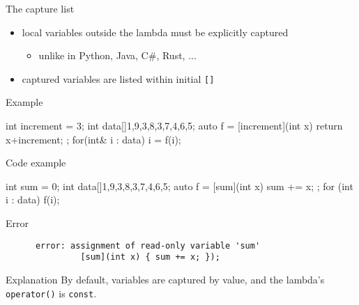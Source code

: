 \begin{frame}[fragile]
  \begin{block}{The capture list}
    \begin{itemize}
    \item local variables outside the lambda must be explicitly captured
    \begin{itemize}
      \item unlike in Python, Java, C\#, Rust, ...
    \end{itemize}
    \item captured variables are listed within initial \texttt{[]}
    \end{itemize}
  \end{block}
  \pause
  \begin{exampleblock}{Example}
    \begin{cppcode*}{}
      int increment = 3;
      int data[]{1,9,3,8,3,7,4,6,5};
      auto f = [increment](int x) { return x+increment; };
      for(int& i : data) i = f(i);
    \end{cppcode*}
  \end{exampleblock}
\end{frame}

\begin{frame}[fragile]
  \begin{exampleblock}{Code example}
    \begin{cppcode}
      int sum = 0;
      int data[]{1,9,3,8,3,7,4,6,5};
      auto f = [sum](int x) { sum += x; };
      for (int i : data) f(i);
    \end{cppcode}
  \end{exampleblock}
  \pause
  \begin{alertblock}{Error}
    \begin{verbatim}
      error: assignment of read-only variable 'sum'
               [sum](int x) { sum += x; });
    \end{verbatim}
  \end{alertblock}
  \pause
  \begin{block}{Explanation}
    By default, variables are captured by value, and the lambda's \texttt{operator()} is \texttt{const}.
  \end{block}
\end{frame}

